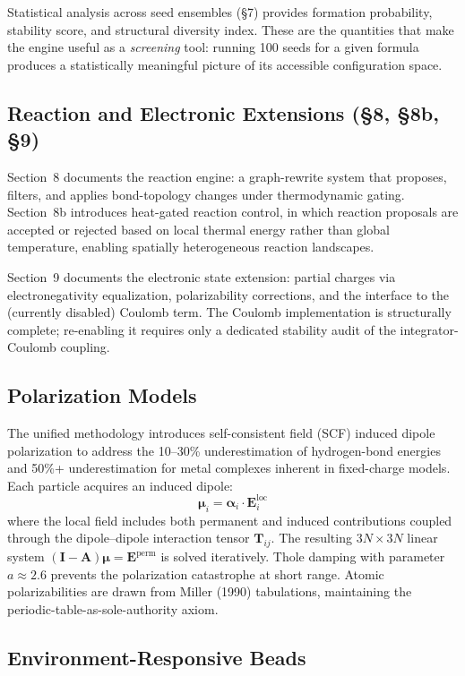 \documentclass[11pt]{article}
\newcommand{\vE}{\mathbf{E}}
\newcommand{\vmu}{\boldsymbol{\mu}}
\newcommand{\valpha}{\boldsymbol{\alpha}}
\newcommand{\boldT}{\mathbf{T}}
\begin{document}
Statistical analysis across seed ensembles (\S7) provides
formation probability, stability score, and structural diversity
index.  These are the quantities that make the engine useful as
a \textit{screening} tool: running 100 seeds for a given formula
produces a statistically meaningful picture of its accessible
configuration space.

\subsection{Reaction and Electronic Extensions (\S8, \S8b, \S9)}

Section~8 documents the reaction engine: a graph-rewrite system
that proposes, filters, and applies bond-topology changes under
thermodynamic gating.  Section~8b introduces heat-gated reaction
control, in which reaction proposals are accepted or rejected
based on local thermal energy rather than global temperature,
enabling spatially heterogeneous reaction landscapes.

Section~9 documents the electronic state extension: partial
charges via electronegativity equalization, polarizability
corrections, and the interface to the (currently disabled)
Coulomb term.  The Coulomb implementation is structurally
complete; re-enabling it requires only a dedicated stability
audit of the integrator-Coulomb coupling.

\subsection{Polarization Models}

The unified methodology introduces self-consistent field (SCF)
induced dipole polarization to address the 10--30\% underestimation
of hydrogen-bond energies and 50\%+ underestimation for metal
complexes inherent in fixed-charge models.  Each particle acquires
an induced dipole:
\[
\vmu_i = \valpha_i \cdot \vE_i^{\text{loc}}
\]
where the local field includes both permanent and induced
contributions coupled through the dipole--dipole interaction tensor
$\boldT_{ij}$.  The resulting $3N \times 3N$ linear system
$(\mathbf{I} - \mathbf{A})\boldsymbol{\mu} = \vE^{\text{perm}}$
is solved iteratively.  Thole damping with parameter $a \approx 2.6$
prevents the polarization catastrophe at short range.  Atomic
polarizabilities are drawn from Miller (1990) tabulations,
maintaining the periodic-table-as-sole-authority axiom.

\subsection{Environment-Responsive Beads}
\end{document}
